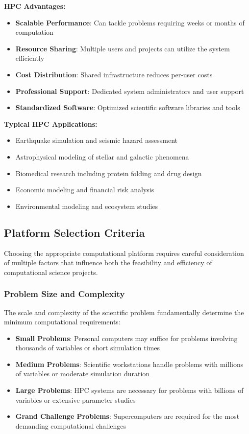 \textbf{HPC Advantages:}
\begin{itemize}
    \item \textbf{Scalable Performance}: Can tackle problems requiring weeks or months of computation
    \item \textbf{Resource Sharing}: Multiple users and projects can utilize the system efficiently
    \item \textbf{Cost Distribution}: Shared infrastructure reduces per-user costs
    \item \textbf{Professional Support}: Dedicated system administrators and user support
    \item \textbf{Standardized Software}: Optimized scientific software libraries and tools
\end{itemize}

\textbf{Typical HPC Applications:}
\begin{itemize}
    \item Earthquake simulation and seismic hazard assessment
    \item Astrophysical modeling of stellar and galactic phenomena
    \item Biomedical research including protein folding and drug design
    \item Economic modeling and financial risk analysis
    \item Environmental modeling and ecosystem studies
\end{itemize}

\subsection{Platform Selection Criteria}

Choosing the appropriate computational platform requires careful consideration of multiple factors that influence both the feasibility and efficiency of computational science projects.

\subsubsection{Problem Size and Complexity}

The scale and complexity of the scientific problem fundamentally determine the minimum computational requirements:

\begin{itemize}
    \item \textbf{Small Problems}: Personal computers may suffice for problems involving thousands of variables or short simulation times
    \item \textbf{Medium Problems}: Scientific workstations handle problems with millions of variables or moderate simulation duration
    \item \textbf{Large Problems}: HPC systems are necessary for problems with billions of variables or extensive parameter studies
    \item \textbf{Grand Challenge Problems}: Supercomputers are required for the most demanding computational challenges
\end{itemize}

